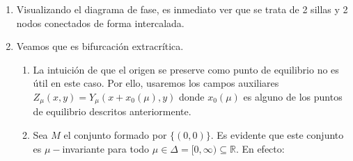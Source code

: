 \begin{exmp}
\begin{enumerate}
		De donde todos los puntos de equilibrio son hiperbólicos. Su estabilidad viene dada por:
		
		\begin{enumerate}
			\item $(-2\sqrt{\mu},0)$ es silla, de autovectores $(1,0)$ del espacio inestable y $(0,1)$ del espacio estable (por ser matriz diagonal). 
			
			\item $(-\sqrt{\mu},0)$ es atractor (asintóticamente estable).
			
			\item $(\sqrt{\mu},0)$ es silla, de autovectores $(1,0)$ del espacio inestable y $(0,1)$ del espacio estable.
			
			\item $(2\sqrt{\mu},0)$ es atractor (asintóticamente estable).
		\end{enumerate}
		
		En el caso de $\mu = 0$, tenemos que la parte lineal viene dada por:
		
		\begin{equation*}
			DX (0,0) =  \begin{pmatrix}
				0 & 0\\
				0 & -1
			\end{pmatrix}
		\end{equation*}
		
		Luego el origen es punto de equilibrio no hiperbólico. Por tanto tenemos una bifurcación cuyo comportamiento presenta una modificación de la estabilidad a partir del origen para valores positivos, con $\Lambda = \mathbb{R}$.
		
		\item Visualizando el diagrama de fase, es inmediato ver que se trata de 2 sillas y 2 nodos conectados de forma intercalada.
		
		\item Veamos que es bifurcación extracrítica. 
		
		\begin{enumerate}
			\item La intuición de que el origen se preserve como punto de equilibrio no es útil en este caso. Por ello, usaremos los campos auxiliares $Z_\mu(x,y) = Y_\mu(x + x_0(\mu) ,y)$ donde $x_0(\mu)$ es alguno de los puntos de equilibrio descritos anteriormente.
			
			\item Sea $M$ el conjunto formado por $\{(0,0)\}$. Es evidente que este conjunto es $\mu-$invariante para todo $\mu \in \Delta = [0,\infty) \subseteq \mathbb{R}$. En efecto:
			

\end{enumerate}
\end{enumerate}
\end{exmp}
